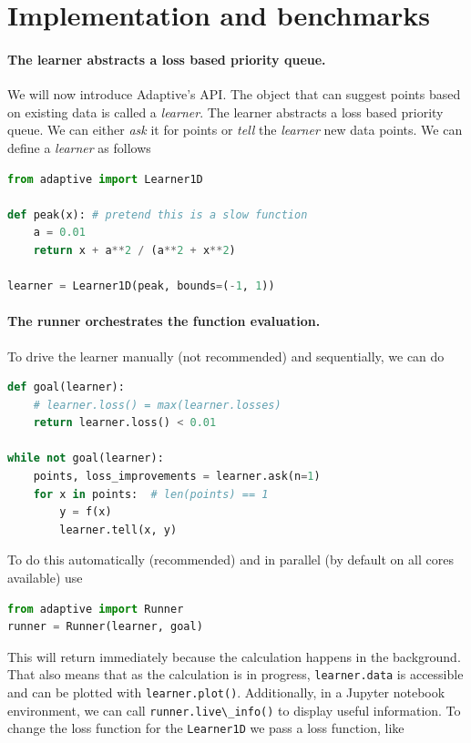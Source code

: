 \documentclass[english, twocolumn, 10pt, aps, superscriptaddress, floatfix, prb, citeautoscript]{revtex4-1}
\newcommand{\passthrough}[1]{\lstset{mathescape=false}#1\lstset{mathescape=true}}
\begin{document}
\section{Implementation and benchmarks}

\paragraph{The learner abstracts a loss based priority queue.}

We will now introduce Adaptive's API.
The object that can suggest points based on existing data is called a \emph{learner}.
The learner abstracts a loss based priority queue.
We can either \emph{ask} it for points or \emph{tell} the \emph{learner} new data points.
We can define a \emph{learner} as follows

\begin{lstlisting}[language=Python]
from adaptive import Learner1D

def peak(x): # pretend this is a slow function
    a = 0.01
    return x + a**2 / (a**2 + x**2)

learner = Learner1D(peak, bounds=(-1, 1))
\end{lstlisting}

\paragraph{The runner orchestrates the function evaluation.}

To drive the learner manually (not recommended) and sequentially, we can do

\begin{lstlisting}[language=Python]
def goal(learner):
    # learner.loss() = max(learner.losses)
    return learner.loss() < 0.01

while not goal(learner):
    points, loss_improvements = learner.ask(n=1)
    for x in points:  # len(points) == 1
        y = f(x)
        learner.tell(x, y)
\end{lstlisting}

To do this automatically (recommended) and in parallel (by default on all cores available) use

\begin{lstlisting}[language=Python]
from adaptive import Runner
runner = Runner(learner, goal)
\end{lstlisting}

This will return immediately because the calculation happens in the background.
That also means that as the calculation is in progress, \passthrough{\lstinline!learner.data!} is accessible and can be plotted with \passthrough{\lstinline!learner.plot()!}.
Additionally, in a Jupyter notebook environment, we can call \passthrough{\lstinline!runner.live\_info()!} to display useful information.
To change the loss function for the \passthrough{\lstinline!Learner1D!} we pass a loss function, like
\end{document}
